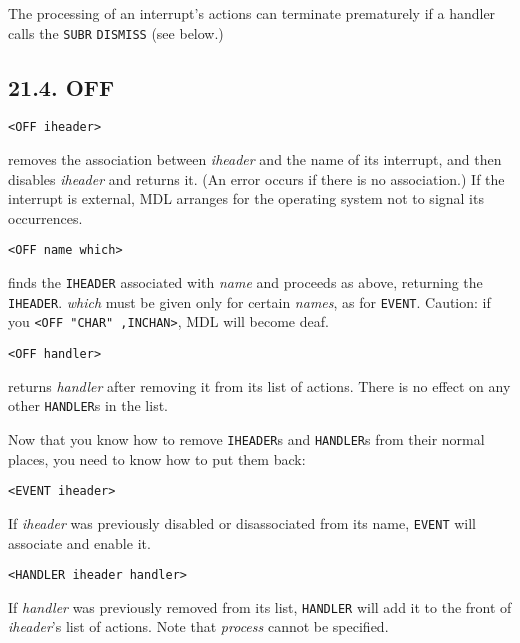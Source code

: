 \documentclass[a4paper,]{article}
\begin{document}
The processing of an interrupt's actions can terminate prematurely if a handler calls the \texttt{SUBR} \texttt{DISMISS}
(see below.)

\subsection{21.4. OFF}\label{off}

\begin{verbatim}
<OFF iheader>
\end{verbatim}

 removes the association between \emph{iheader} and the name of its interrupt, and then disables
\emph{iheader} and returns it. (An error occurs if there is no association.) If the interrupt is external, MDL arranges for
the operating system not to signal its occurrences.

\begin{verbatim}
<OFF name which>
\end{verbatim}

finds the \texttt{IHEADER} associated with \emph{name} and proceeds as above, returning the \texttt{IHEADER}. \emph{which}
must be given only for certain \emph{names}, as for \texttt{EVENT}. Caution: if you
\texttt{\textless{}OFF\ "CHAR"\ ,INCHAN\textgreater{}}, MDL will become deaf.

\begin{verbatim}
<OFF handler>
\end{verbatim}

returns \emph{handler} after removing it from its list of actions. There is no effect on any other
\texttt{HANDLER}s in the list.

Now that you know how to remove \texttt{IHEADER}s and \texttt{HANDLER}s from their normal places, you need to know how to
put them back:

\begin{verbatim}
<EVENT iheader>
\end{verbatim}

If \emph{iheader} was previously disabled or disassociated from its name, \texttt{EVENT} will associate and enable it.

\begin{verbatim}
<HANDLER iheader handler>
\end{verbatim}

If \emph{handler} was previously removed from its list, \texttt{HANDLER} will add it to the front of \emph{iheader}'s list
of actions. Note that \emph{process} cannot be specified.
\end{document}
